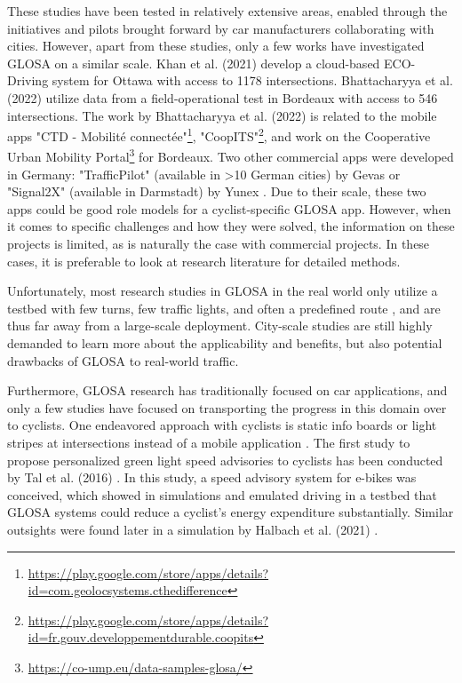 These studies have been tested in relatively extensive areas, enabled through the initiatives and pilots brought forward by car manufacturers collaborating with cities. However, apart from these studies, only a few works have investigated GLOSA on a similar scale. Khan et al. (2021) \cite{khan_eco-drive_2021} develop a cloud-based ECO-Driving system for Ottawa with access to 1178 intersections. Bhattacharyya et al. (2022) \cite{bhattacharyya_assessing_2022} utilize data from a field-operational test in Bordeaux with access to 546 intersections. The work by Bhattacharyya et al. (2022) \cite{bhattacharyya_assessing_2022} is related to the mobile apps "CTD - Mobilité connectée"\footnote{\url{https://play.google.com/store/apps/details?id=com.geolocsystems.cthedifference}}, "CoopITS"\footnote{\url{https://play.google.com/store/apps/details?id=fr.gouv.developpementdurable.coopits}}, and work on the Cooperative Urban Mobility Portal\footnote{\url{https://co-ump.eu/data-samples-glosa/}} for Bordeaux. Two other commercial apps were developed in Germany: "TrafficPilot" (available in >10 German cities) by Gevas or "Signal2X" (available in Darmstadt) by Yunex \cite{yunex_traffic_v2x-kommunikation_2023}. Due to their scale, these two apps could be good role models for a cyclist-specific GLOSA app. However, when it comes to specific challenges and how they were solved, the information on these projects is limited, as is naturally the case with commercial projects. In these cases, it is preferable to look at research literature for detailed methods. 

Unfortunately, most research studies in GLOSA in the real world only utilize a testbed with few turns, few traffic lights, and often a predefined route \cite{iglesias_i2v_2008, schweiger_elisatm_2011, raubitschek_predictive_2011, koukoumidis_signalguru_2011, koukoumidis_leveraging_2012, hao_eco-approach_2019, fickas_fast_2019, chen_developing_2022}, and are thus far away from a large-scale deployment. City-scale studies are still highly demanded to learn more about the applicability and benefits, but also potential drawbacks of GLOSA to real-world traffic.

Furthermore, GLOSA research has traditionally focused on car applications, and only a few studies have focused on transporting the progress in this domain over to cyclists. One endeavored approach with cyclists is static info boards or light stripes at intersections instead of a mobile application \cite{lu_enhancement_2018}. The first study to propose personalized green light speed advisories to cyclists has been conducted by Tal et al. (2016) \cite{tal_vehicular-communications-based_2016}. In this study, a speed advisory system for e-bikes was conceived, which showed in simulations and emulated driving in a testbed that GLOSA systems could reduce a cyclist's energy expenditure substantially. Similar outsights were found later in a simulation by Halbach et al. (2021) \cite{halbach_cooperative_2021}. 

